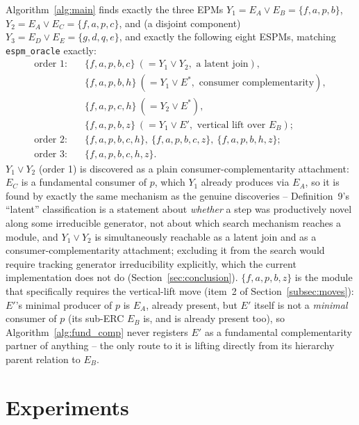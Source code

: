 \documentclass[11pt]{article}
\theoremstyle{plain}
\theoremstyle{remark}
\newcommand{\js}{\vee}
\begin{document}
Algorithm~\ref{alg:main} finds exactly the three EPMs
$Y_1=E_A\js E_B=\{f,a,p,b\}$, $Y_2=E_A\js E_C=\{f,a,p,c\}$, and (a disjoint
component) $Y_3=E_D\js E_E=\{g,d,q,e\}$, and exactly the following eight
ESPMs, matching \texttt{espm\_oracle} exactly:
\begin{align*}
\text{order 1:}\quad
&\{f,a,p,b,c\}\ (=Y_1\js Y_2,\text{ a latent join}),\\
&\{f,a,p,b,h\}\ (=Y_1\js E^{*},\text{ consumer complementarity}),\\
&\{f,a,p,c,h\}\ (=Y_2\js E^{*}),\\
&\{f,a,p,b,z\}\ (=Y_1\js E',\text{ vertical lift over }E_B);\\
\text{order 2:}\quad
&\{f,a,p,b,c,h\},\ \{f,a,p,b,c,z\},\ \{f,a,p,b,h,z\};\\
\text{order 3:}\quad
&\{f,a,p,b,c,h,z\}.
\end{align*}
$Y_1\js Y_2$ (order 1) is discovered as a plain consumer-complementarity
attachment: $E_C$ is a fundamental consumer of $p$, which $Y_1$ already
produces via $E_A$, so it is found by exactly the same mechanism as the
genuine discoveries -- Definition~9's ``latent'' classification is a
statement about \emph{whether} a step was productively novel along some
irreducible generator, not about which search mechanism reaches a module,
and $Y_1\js Y_2$ is simultaneously reachable as a latent join and as a
consumer-complementarity attachment; excluding it from the search would
require tracking generator irreducibility explicitly, which the current
implementation does not do (Section~\ref{sec:conclusion}). $\{f,a,p,b,z\}$
is the module that specifically requires the vertical-lift move
(item~2 of Section~\ref{subsec:moves}): $E'$'s minimal producer of $p$ is
$E_A$, already present, but $E'$ itself is not a \emph{minimal} consumer
of $p$ (its sub-ERC $E_B$ is, and is already present too), so
Algorithm~\ref{alg:fund_comp} never registers $E'$ as a fundamental
complementarity partner of anything -- the only route to it is lifting
directly from its hierarchy parent relation to $E_B$.

\section{Experiments}\label{sec:experiments}
\end{document}
